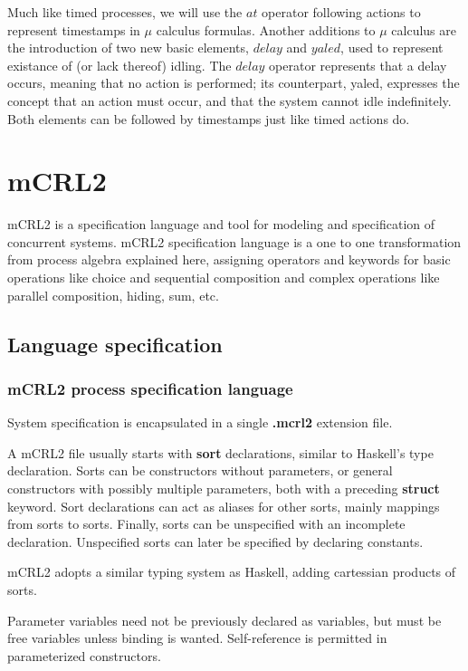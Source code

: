 \documentclass[11pt]{article}
\theoremstyle{definition}
\theoremstyle{plain}
\theoremstyle{definition}
\begin{document}
Much like timed processes, we will use the $ at $ operator following actions to represent timestamps in $ \mu $ calculus formulas. Another additions to $ \mu $ calculus are the introduction of two new basic elements, $ delay $ and $ yaled $, used to represent existance of (or lack thereof) idling. The $ delay $ operator represents that a delay occurs, meaning that no action is performed; its counterpart, yaled, expresses the concept that an action must occur, and that the system cannot idle indefinitely. Both elements can be followed by timestamps just like timed actions do.

\section{mCRL2}

mCRL2 is a specification language and tool for modeling and specification of concurrent systems. mCRL2 specification language is a one to one transformation from process algebra explained here, assigning operators and keywords for basic operations like choice and sequential composition and complex operations like parallel composition, hiding, sum, etc.

\subsection{Language specification}

\subsubsection{mCRL2 process specification language}

System specification is encapsulated in a single \textbf{.mcrl2} extension file. 

A mCRL2 file usually starts with \textbf{sort} declarations, similar to Haskell's type declaration. Sorts can be constructors without parameters, or general constructors with possibly multiple parameters, both with a preceding \textbf{struct} keyword. Sort declarations can act as aliases for other sorts, mainly mappings from sorts to sorts. Finally, sorts can be unspecified with an incomplete declaration. Unspecified sorts can later be specified by declaring constants.

mCRL2 adopts a similar typing system as Haskell, adding cartessian products of sorts.


Parameter variables need not be previously declared as variables, but must be free variables unless binding is wanted. Self-reference is permitted in parameterized constructors.
\end{document}
